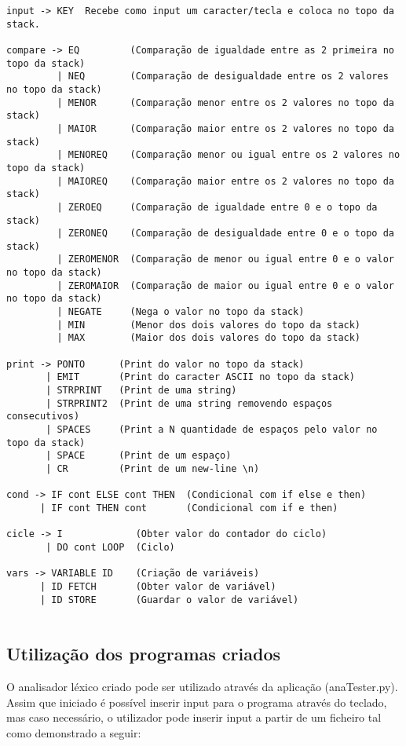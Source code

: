 \documentclass{article}
\begin{document}
\begin{verbatim}
input -> KEY  Recebe como input um caracter/tecla e coloca no topo da stack.
 
compare -> EQ         (Comparação de igualdade entre as 2 primeira no topo da stack) 
         | NEQ        (Comparação de desigualdade entre os 2 valores no topo da stack) 
         | MENOR      (Comparação menor entre os 2 valores no topo da stack) 
         | MAIOR      (Comparação maior entre os 2 valores no topo da stack)
         | MENOREQ    (Comparação menor ou igual entre os 2 valores no topo da stack)
         | MAIOREQ    (Comparação maior entre os 2 valores no topo da stack)
         | ZEROEQ     (Comparação de igualdade entre 0 e o topo da stack)
         | ZERONEQ    (Comparação de desigualdade entre 0 e o topo da stack)
         | ZEROMENOR  (Comparação de menor ou igual entre 0 e o valor no topo da stack)
         | ZEROMAIOR  (Comparação de maior ou igual entre 0 e o valor no topo da stack)
         | NEGATE     (Nega o valor no topo da stack)
         | MIN        (Menor dos dois valores do topo da stack)
         | MAX        (Maior dos dois valores do topo da stack)

print -> PONTO      (Print do valor no topo da stack)
       | EMIT       (Print do caracter ASCII no topo da stack) 
       | STRPRINT   (Print de uma string)
       | STRPRINT2  (Print de uma string removendo espaços consecutivos)
       | SPACES     (Print a N quantidade de espaços pelo valor no topo da stack)
       | SPACE      (Print de um espaço)
       | CR         (Print de um new-line \n)

cond -> IF cont ELSE cont THEN  (Condicional com if else e then)
      | IF cont THEN cont       (Condicional com if e then)

cicle -> I             (Obter valor do contador do ciclo)
       | DO cont LOOP  (Ciclo)

vars -> VARIABLE ID    (Criação de variáveis)
      | ID FETCH       (Obter valor de variável)
      | ID STORE       (Guardar o valor de variável)
      
\end{verbatim}






\subsection{Utilização dos programas criados}
O analisador léxico criado pode ser utilizado através da aplicação (anaTester.py). Assim que iniciado é possível inserir input para o programa através do teclado, mas caso necessário, o utilizador pode inserir input a partir de um ficheiro tal como demonstrado a seguir:
\end{document}
